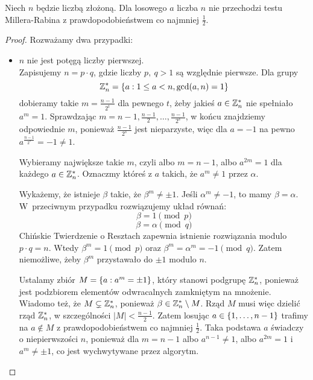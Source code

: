 \begin{lemma}
	Niech \( n \) będzie liczbą złożoną. Dla losowego \( a \) liczba \( n \) nie przechodzi testu Millera-Rabina z prawdopodobieństwem co najmniej \( \frac{1}{2} \).
\end{lemma}
\begin{proof}
	Rozważamy dwa przypadki:
	\begin{itemize}
		\item \( n \) nie jest potęgą liczby pierwszej. \\
		      Zapisujemy \( n = p \cdot q \), gdzie liczby \( p, \ q > 1 \) są względnie pierwsze.
		      Dla grupy
		      \[
			      \integer_n^* = \set{a : 1 \le a < n, \gcd(a,n) = 1}
		      \]
		      dobieramy takie \( m = \frac{n-1}{2^t} \) dla pewnego \( t \), żeby jakieś \( a \in \mathbb{Z}_n^* \) nie spełniało \( a^m = 1 \).
		      Sprawdzając \( m = n-1, \frac{n-1}{2}, \dots, \frac{n-1}{2^s} \), w końcu znajdziemy odpowiednie \( m \), ponieważ \( \frac{n-1}{2^s} \) jest nieparzyste, więc dla \( a = -1\)  na pewno \( a^{\frac{n-1}{2^s}} = -1 \ne 1 \).

		      Wybieramy największe takie \( m \), czyli albo \( m = n - 1 \), albo \( a^{2m} = 1 \) dla każdego \( a \in \mathbb{Z}_n^* \). Oznaczmy któreś z \( a \) takich, że \( a^m \neq 1 \) przez \( \alpha \).

		      Wykażemy, że istnieje \( \beta \) takie, że \( \beta^m \neq \pm 1 \). Jeśli \( \alpha^m \neq -1 \), to mamy \( \beta = \alpha \). W~przeciwnym przypadku rozwiązujemy układ równań:
		      \[
			      \beta = 1 \pmod{p}
		      \]
		      \[
			      \beta = \alpha \pmod{q}
		      \]
		      Chińskie Twierdzenie o Resztach zapewnia istnienie rozwiązania modulo \( p \cdot q = n \). Wtedy \( \beta^m = 1 \pmod{p} \) oraz \( \beta^m = \alpha^m = -1 \pmod{q} \).
		      Zatem niemożliwe, żeby \( \beta^m \) przystawało do \( \pm 1 \) modulo \( n \).

		      Ustalamy zbiór \( M = \set{a : a^m = \pm 1} \), który stanowi podgrupę \( \mathbb{Z}_n^* \), ponieważ jest podzbiorem elementów odwracalnych zamkniętym na mnożenie.
		      Wiadomo też, że \( M \subsetneq \mathbb{Z}_n^* \), ponieważ \( \beta \in \mathbb{Z}_n^* \setminus M \). Rząd \( M \) musi więc dzielić rząd \( \mathbb{Z}_n^* \), w szczególności \( |M| < \frac{n-1}{2} \).
		      Zatem losując \( a \in \set{1, \dots, n-1} \) trafimy na \( a \notin M \) z prawdopodobieństwem co najmniej \( \frac{1}{2} \). Taka podstawa \( a \) świadczy o niepierwszości \( n \), ponieważ dla \( m = n-1 \) albo \( a^{n-1} \neq 1 \), albo \( a^{2m} = 1 \) i \( a^m \neq \pm 1 \), co jest wychwytywane przez algorytm.


\end{itemize}
\end{proof}
